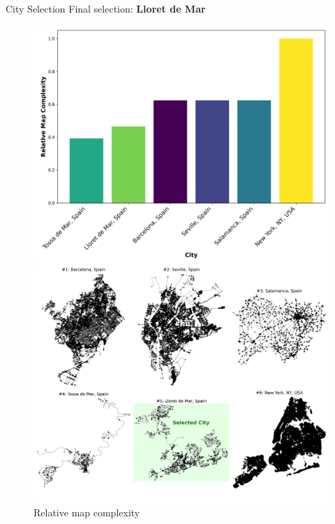 \documentclass{beamer}
\begin{document}
\begin{frame}{City Selection}
    \large{Final selection: \textbf{Lloret de Mar}}
    \begin{figure}[H]
        \centering
        \begin{minipage}[c]{0.3\textwidth}
            \includegraphics[width=\textwidth]{../figures/relative_map_complexity.png}
            \caption{Relative map complexity}
        \end{minipage}%
        \hspace{0.05\textwidth}%
        \begin{minipage}[c]{0.65\textwidth}
            \includegraphics[width=\textwidth]{../figures/maps_of_candidate_cities.png}
        \end{minipage}
    \end{figure}
\end{frame}
\end{document}
